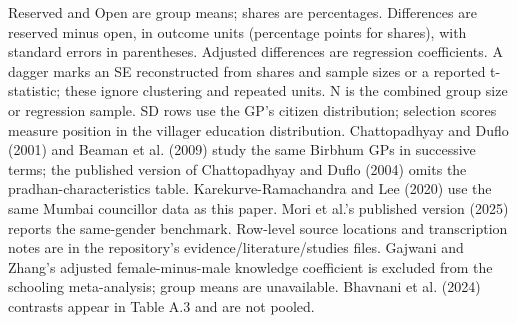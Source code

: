 {\begin{longtable}
\end{longtable}
\noindent Reserved and Open are group means; shares are percentages. Differences are reserved minus open, in outcome units (percentage points for shares), with standard errors in parentheses. Adjusted differences are regression coefficients. A dagger marks an SE reconstructed from shares and sample sizes or a reported t-statistic; these ignore clustering and repeated units. N is the combined group size or regression sample. SD rows use the GP's citizen distribution; selection scores measure position in the villager education distribution. Chattopadhyay and Duflo (2001) and Beaman et al. (2009) study the same Birbhum GPs in successive terms; the published version of Chattopadhyay and Duflo (2004) omits the pradhan-characteristics table. Karekurve-Ramachandra and Lee (2020) use the same Mumbai councillor data as this paper. Mori et al.'s published version (2025) reports the same-gender benchmark. Row-level source locations and transcription notes are in the repository's evidence/literature/studies files. Gajwani and Zhang's adjusted female-minus-male knowledge coefficient is excluded from the schooling meta-analysis; group means are unavailable. Bhavnani et al. (2024) contrasts appear in Table A.3 and are not pooled.\par
}
